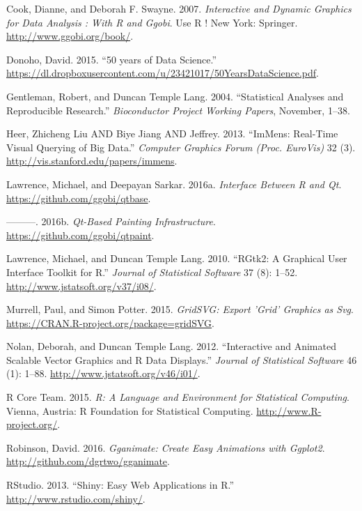 \documentclass[12pt,]{article}
\theoremstyle{definition}
\theoremstyle{definition}
\theoremstyle{remark}
\begin{document}
\hypertarget{ref-ggobi:2007}{}
Cook, Dianne, and Deborah F. Swayne. 2007. \emph{Interactive and Dynamic
Graphics for Data Analysis : With R and Ggobi}. Use R ! New York:
Springer. \url{http://www.ggobi.org/book/}.

\hypertarget{ref-Donoho:2015tu}{}
Donoho, David. 2015. ``50 years of Data Science.''
\url{https://dl.dropboxusercontent.com/u/23421017/50YearsDataScience.pdf}.

\hypertarget{ref-Gentleman:Lang}{}
Gentleman, Robert, and Duncan Temple Lang. 2004. ``Statistical Analyses
and Reproducible Research.'' \emph{Bioconductor Project Working Papers},
November, 1--38.

\hypertarget{ref-2013-immens}{}
Heer, Zhicheng Liu AND Biye Jiang AND Jeffrey. 2013. ``ImMens: Real-Time
Visual Querying of Big Data.'' \emph{Computer Graphics Forum (Proc.
EuroVis)} 32 (3). \url{http://vis.stanford.edu/papers/immens}.

\hypertarget{ref-qtbase}{}
Lawrence, Michael, and Deepayan Sarkar. 2016a. \emph{Interface Between R
and Qt}. \url{https://github.com/ggobi/qtbase}.

\hypertarget{ref-qtpaint}{}
---------. 2016b. \emph{Qt-Based Painting Infrastructure}.
\url{https://github.com/ggobi/qtpaint}.

\hypertarget{ref-RGtk2}{}
Lawrence, Michael, and Duncan Temple Lang. 2010. ``RGtk2: A Graphical
User Interface Toolkit for R.'' \emph{Journal of Statistical Software}
37 (8): 1--52. \url{http://www.jstatsoft.org/v37/i08/}.

\hypertarget{ref-gridSVG}{}
Murrell, Paul, and Simon Potter. 2015. \emph{GridSVG: Export 'Grid'
Graphics as Svg}. \url{https://CRAN.R-project.org/package=gridSVG}.

\hypertarget{ref-SVGAnnotation}{}
Nolan, Deborah, and Duncan Temple Lang. 2012. ``Interactive and Animated
Scalable Vector Graphics and R Data Displays.'' \emph{Journal of
Statistical Software} 46 (1): 1--88.
\url{http://www.jstatsoft.org/v46/i01/}.

\hypertarget{ref-RCore}{}
R Core Team. 2015. \emph{R: A Language and Environment for Statistical
Computing}. Vienna, Austria: R Foundation for Statistical Computing.
\url{http://www.R-project.org/}.

\hypertarget{ref-gganimate}{}
Robinson, David. 2016. \emph{Gganimate: Create Easy Animations with
Ggplot2}. \url{http://github.com/dgrtwo/gganimate}.

\hypertarget{ref-shiny}{}
RStudio. 2013. ``Shiny: Easy Web Applications in R.''
\url{http://www.rstudio.com/shiny/}.
\end{document}
